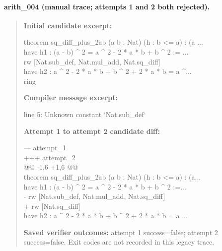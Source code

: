 \paragraph{arith\_004 (manual trace; attempts 1 and 2 both rejected).}
\begin{quote}\small
\textbf{Initial candidate excerpt:}\par\ttfamily
theorem sq\_diff\_plus\_2ab (a b : Nat) (h : b <= a) : (a ...\\
  have h1 : (a - b) \textasciicircum{} 2 = a \textasciicircum{} 2 - 2 * a * b + b \textasciicircum{} 2 := ...\\
    rw [Nat.sub\_def, Nat.mul\_add, Nat.sq\_diff]\\
  have h2 : a \textasciicircum{} 2 - 2 * a * b + b \textasciicircum{} 2 + 2 * a * b = a \textasciicircum{}...\\
    ring\\
\par\textbf{Compiler message excerpt:}\par\ttfamily
line 5: Unknown constant `Nat.sub\_def`\\
\par\textbf{Attempt 1 to attempt 2 candidate diff:}\par\ttfamily
--- attempt\_1\\
+++ attempt\_2\\
@@ -1,6 +1,6 @@\\
 theorem sq\_diff\_plus\_2ab (a b : Nat) (h : b <= a) : (a...\\
   have h1 : (a - b) \textasciicircum{} 2 = a \textasciicircum{} 2 - 2 * a * b + b \textasciicircum{} 2 :=...\\
-    rw [Nat.sub\_def, Nat.mul\_add, Nat.sq\_diff]\\
+    rw [Nat.sq\_diff]\\
   have h2 : a \textasciicircum{} 2 - 2 * a * b + b \textasciicircum{} 2 + 2 * a * b = a ...\\
\par\textbf{Saved verifier outcomes:} attempt 1 success=false; attempt 2 success=false. Exit codes are not recorded in this legacy trace.
\end{quote}
